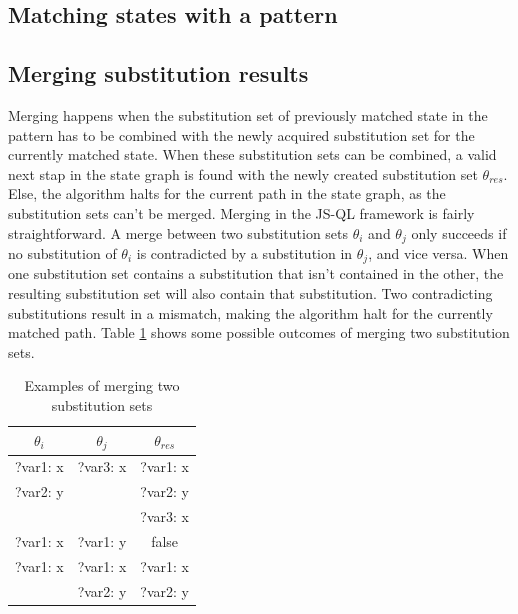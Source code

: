 \subsection{Matching states with a pattern}
\label{subsec:matching}


\subsection{Merging substitution results}
\label{subsec:merging}

Merging happens when the substitution set of previously matched state in the pattern has to be combined with the newly acquired substitution set for the currently matched state. When these substitution sets can be combined, a valid next stap in the state graph is found with the newly created substitution set $\theta_{res}$. Else, the algorithm halts for the current path in the state graph, as the substitution sets can't be merged. Merging in the JS-QL framework is fairly straightforward. A merge between two substitution sets $\theta_i$ and $\theta_j$ only succeeds if no substitution of $\theta_i$ is contradicted by a substitution in $\theta_j$, and vice versa. When one substitution set contains a substitution that isn't contained in the other, the resulting substitution set will also contain that substitution. Two contradicting substitutions result in a mismatch, making the algorithm halt for the currently matched path. Table \ref{tab:merging} shows some possible outcomes of merging two substitution sets.

\begin{table}[!h]
\centering
  \begin{tabular}{| c | c | c |}
  \hline
  $\theta_i$ & $\theta_j$ & $\theta_{res}$\\
  \hline \hline
  ?var1: x & ?var3: x & ?var1: x\\
  ?var2: y &  & ?var2: y\\
  &  & ?var3: x\\
  \hline
  ?var1: x & ?var1: y & false\\
  \hline
  ?var1: x & ?var1: x & ?var1: x\\
  & ?var2: y & ?var2: y \\
  \hline

  \end{tabular}
  
  \caption{Examples of merging two substitution sets}
  \label{tab:merging}
\end{table}

